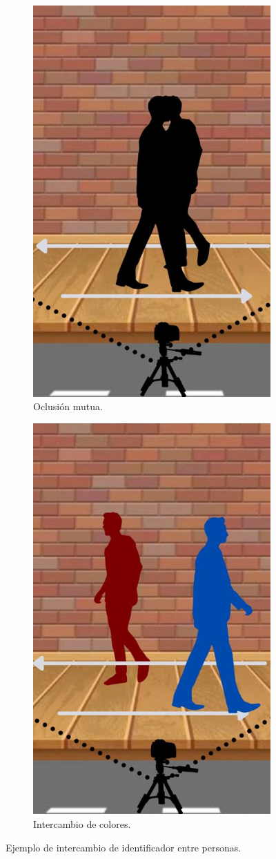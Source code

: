 \begin{figure}[!htpb]
\begin{subfigure}[b]{0.3\textwidth}
         \includegraphics[width=.65\textwidth]{./Figures/id_switch2.jpg}
         \caption{Oclusión mutua.}
         \label{fig:id_switch2de3}
     \end{subfigure}
     \hfill
     \begin{subfigure}[b]{0.3\textwidth}
         \centering
         \includegraphics[width=.65\textwidth]{./Figures/id_switch3.jpg}
         \caption{Intercambio de colores.}
         \label{fig:id_switch3de3}
     \end{subfigure}
        \caption{Ejemplo de intercambio de identificador entre personas.}
        \label{fig:id_switch}
\end{figure}

